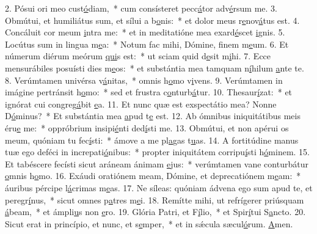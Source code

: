 2. Pósui ori meo cust\uline{ó}diam,~* cum consísteret pecc\uline{á}tor adv\uline{é}rsum me.
3. Obmútui, et humiliátus sum, et sílui a b\uline{o}nis:~* et dolor meus r\uline{e}nov\uline{á}tus est.
4. Concáluit cor meum \uline{i}ntra me:~* et in meditatióne mea exard\uline{é}scet \uline{i}gnis.
5. Locútus sum in lingua m\uline{e}a:~* Notum fac mihi, Dómine, f\uline{i}nem m\uline{e}um.
6. Et númerum diérum meórum \uline{qui}s est:~* ut sciam quid d\uline{e}sit m\uline{i}hi.
7. Ecce mensurábiles posuísti dies m\uline{e}os:~* et substántia mea tamquam n\uline{í}hilum \uline{a}nte te.
8. Verúmtamen univérsa v\uline{á}nitas,~* omnis h\uline{o}mo v\uline{i}vens.
9. Verúmtamen in imágine pertránsit h\uline{o}mo:~* sed et frustra c\uline{o}nturb\uline{á}tur.
10. Thesaur\uline{í}zat:~* et ignórat cui congreg\uline{á}bit \uline{e}a.
11. Et nunc quæ est exspectátio mea? Nonne D\uline{ó}minus?~* Et substántia mea \uline{a}pud t\uline{e} est.
12. Ab ómnibus iniquitátibus meis éru\uline{e} me:~* oppróbrium insipi\uline{é}nti ded\uline{í}sti me.
13. Obmútui, et non apérui os meum, quóniam tu fec\uline{í}sti:~* ámove a me pl\uline{a}gas t\uline{u}as.
14. A fortitúdine manus tuæ ego deféci in increpati\uline{ó}nibus:~* propter iniquitátem corripu\uline{í}sti h\uline{ó}minem.
15. Et tabéscere fecísti sicut aráneam ánimam \uline{e}jus:~* verúmtamen vane conturbátur \uline{o}mnis h\uline{o}mo.
16. Exáudi oratiónem meam, Dómine, et deprecatiónem m\uline{e}am:~* áuribus pércipe l\uline{á}crimas m\uline{e}as.
17. Ne síleas: quóniam ádvena ego sum apud te, et peregr\uline{í}nus,~* sicut omnes p\uline{a}tres m\uline{e}i.
18. Remítte mihi, ut refrígerer priúsquam \uline{á}beam,~* et ámpli\uline{u}s non \uline{e}ro.
19. Glória Patri, et F\uline{í}lio,~* et Spir\uline{í}tui S\uline{a}ncto.
20. Sicut erat in princípio, et nunc, et s\uline{e}mper,~* et in sǽcula sæcul\uline{ó}rum. \uline{A}men.
